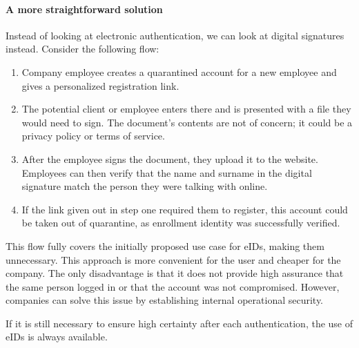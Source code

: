 \paragraph{A more straightforward solution}

Instead of looking at electronic authentication, we can look at digital signatures instead. Consider the following flow:

\begin{enumerate}
    \item Company employee creates a quarantined account for a new employee and gives a personalized registration link.
    \item The potential client or employee enters there and is presented with a file they would need to sign. The document's contents are not of concern; it could be a privacy policy or terms of service.
    \item After the employee signs the document, they upload it to the website. Employees can then verify that the name and surname in the digital signature match the person they were talking with online.
    \item If the link given out in step one required them to register, this account could be taken out of quarantine, as enrollment identity was successfully verified.
\end{enumerate}

This flow fully covers the initially proposed use case for eIDs, making them unnecessary. This approach is more convenient for the user and cheaper for the company. The only disadvantage is that it does not provide high assurance that the same person logged in or that the account was not compromised. However, companies can solve this issue by establishing internal operational security.

If it is still necessary to ensure high certainty after each authentication, the use of eIDs is always available.